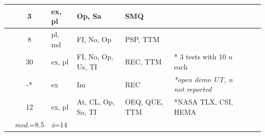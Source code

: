 \documentclass[sigchi, review]{acmart}
\begin{document}
\begin{table}[t]
{\begin{tabular}{lcllllll}
\cite{ogata2017keyboard}            & 3         & ex, pl    & Op, Sa            & SMQ                   &   \\ \hline 
\cite{mcpherson2013space}           & 8         & pl, md    & FI, No, Op        & PSP, TTM               &   \\ \hline 
\cite{mcpherson2011multidimensional} & 30        & ex, pl    & FI, No, Op, Us, TI   & REC, TTM        & * 3 tests with 10 $n$ each  \\ \hline 
\cite{granieri2019reach}            & -*         & ex    & Im           & REC                   & \textit{*open demo UT, n not reported}  \\ \hline 
\cite{karolus2020hit}                & 12         & ex, pl    & At, CL, Op, Sa, TI            & OEQ, QUE, TTM                  &  *NASA TLX\cite{hart1988development}, CSI\cite{carroll2009creativity}, HEMA\cite{huta2010pursuing} \\ \hline 
                                   & \textit{med.}=8.5 & \textit{\={x}}=14   &                   &                       & \\ \hline \hline 
\end{tabular}%
}
\end{table}
\end{document}
